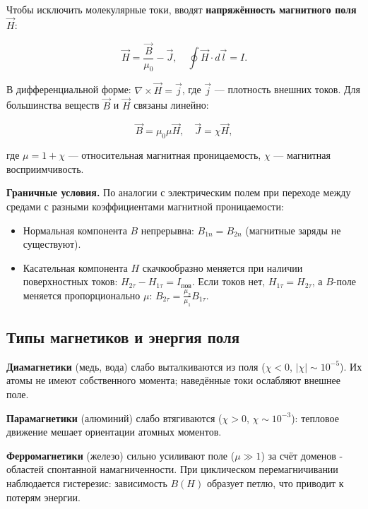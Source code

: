 \documentclass[12pt]{article}
\begin{document}
Чтобы исключить молекулярные токи, вводят \textbf{напряжённость магнитного поля} $\vec{H}$:

\[
    \vec{H} = \frac{\vec{B}}{\mu_0} - \vec{J}, \quad \oint \vec{H} \cdot d\vec{l} = I.
\]

В дифференциальной форме: $\nabla \times \vec{H} = \vec{j}$, где $\vec{j}$ — плотность внешних токов. 
Для большинства веществ $\vec{B}$ и $\vec{H}$ связаны линейно:

\[
    \vec{B} = \mu_0\mu\vec{H}, \quad \vec{J} = \chi\vec{H},
\]

где $\mu = 1 + \chi$ — относительная магнитная проницаемость, $\chi$ — магнитная восприимчивость. 

\vspace{0.5cm}

\noindent\textbf{Граничные условия.} По аналогии с электрическим полем при переходе между средами с 
разными коэффициентами магнитной проницаемости:

\begin{itemize}
    \item Нормальная компонента $B$ непрерывна: $B_{1n} = B_{2n}$ (магнитные заряды не существуют).
    \item Касательная компонента $H$ скачкообразно меняется при наличии поверхностных токов: $H_{2\tau} - H_{1\tau} = I_{\text{пов}}$. 
    Если токов нет, $H_{1\tau} = H_{2\tau}$, 
    а $B$-поле меняется пропорционально $\mu$: $B_{2\tau} = \frac{\mu_2}{\mu_1} B_{1\tau}$.
\end{itemize}

\subsection{Типы магнетиков и энергия поля}

\noindent\textbf{Диамагнетики} (медь, вода) слабо выталкиваются из поля ($\chi < 0$, $|\chi| \sim 10^{-5}$). 
Их атомы не имеют собственного момента; наведённые токи ослабляют внешнее поле. 

\textbf{Парамагнетики} (алюминий) слабо втягиваются ($\chi > 0$, $\chi \sim 10^{-3}$): 
тепловое движение мешает ориентации атомных моментов. 

\textbf{Ферромагнетики} (железо) сильно усиливают поле ($\mu \gg 1$) за счёт доменов - 
областей спонтанной намагниченности. При циклическом перемагничивании наблюдается гистерезис: 
зависимость $B(H)$ образует петлю, что приводит к потерям энергии.

\vspace{0.5cm}
\end{document}
